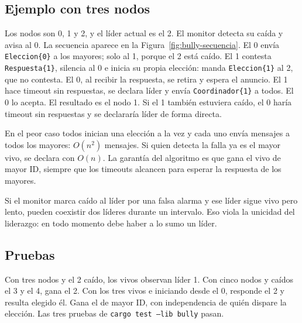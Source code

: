\subsection{Ejemplo con tres nodos}

Los nodos son 0, 1 y 2, y el líder actual es el 2. El monitor detecta su
caída y avisa al 0. La secuencia aparece en la
Figura~\ref{fig:bully-secuencia}. El 0 envía \texttt{Eleccion\{0\}} a
los mayores; solo al 1, porque el 2 está caído. El 1 contesta
\texttt{Respuesta\{1\}}, silencia al 0 e inicia su propia elección:
manda \texttt{Eleccion\{1\}} al 2, que no contesta. El 0, al recibir la
respuesta, se retira y espera el anuncio. El 1 hace timeout sin
respuestas, se declara líder y envía \texttt{Coordinador\{1\}} a todos.
El 0 lo acepta. El resultado es el nodo 1. Si el 1 también estuviera
caído, el 0 haría timeout sin respuestas y se declararía líder de forma
directa.

En el peor caso todos inician una elección a la vez y cada uno envía
mensajes a todos los mayores: $O(n^2)$ mensajes. Si quien detecta la
falla ya es el mayor vivo, se declara con $O(n)$. La garantía del
algoritmo es que gana el vivo de mayor ID, siempre que los timeouts
alcancen para esperar la respuesta de los mayores.

Si el monitor marca caído al líder por una falsa alarma y ese líder
sigue vivo pero lento, pueden coexistir dos líderes durante un intervalo.
Eso viola la unicidad del liderazgo: en todo momento debe haber a lo
sumo un líder.

\subsection{Pruebas}

Con tres nodos y el 2 caído, los vivos observan líder 1. Con cinco nodos
y caídos el 3 y el 4, gana el 2. Con los tres vivos e iniciando desde el
0, responde el 2 y resulta elegido él. Gana el de mayor ID, con
independencia de quién dispare la elección. Las tres pruebas de
\texttt{cargo test --lib bully} pasan.
